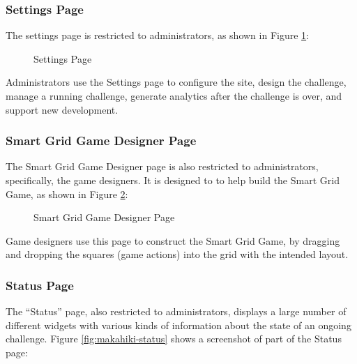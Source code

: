 \subsubsection{Settings Page}

The settings page is restricted to administrators, as shown in Figure \ref{fig:makahiki-settings}: 

\begin{figure}[!ht]
\begin{center}
\end{center}
\caption{Settings Page}
\label{fig:makahiki-settings}
\end{figure}

Administrators use the Settings page to configure the site, design the challenge, manage a running challenge, generate analytics after the challenge is over, and support new development. 

\clearpage

\subsubsection{Smart Grid Game Designer Page}

The Smart Grid Game Designer page is also restricted to administrators, specifically, the game designers. It is designed to to help build the Smart Grid Game, as shown in Figure \ref{fig:makahiki-designer}:

\begin{figure}[!ht]
\begin{center}
\end{center}
\caption{Smart Grid Game Designer Page}
\label{fig:makahiki-designer}
\end{figure}

Game designers use this page to construct the Smart Grid Game, by dragging and dropping the squares (game actions) into the grid with the intended layout.

\clearpage

\subsubsection{Status Page}

The ``Status'' page, also restricted to administrators, displays a large number of different widgets with various kinds of information about the state of an ongoing challenge. Figure \ref{fig:makahiki-status} shows a screenshot of part of the Status page:

